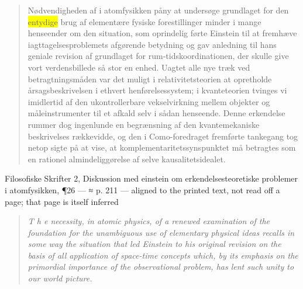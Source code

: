 \documentclass[11pt]{article}
\newcommand{\dcite}[1]{{\nopagebreak\raggedleft\small #1\par}\medskip}
\newcommand{\tlg}[1]{{\setlength{\fboxsep}{0.8pt}\colorbox{yellow}{#1}}}
\newcommand{\olg}[1]{{\setlength{\fboxsep}{0.8pt}\colorbox{cyan!25}{#1}}}
\begin{document}
\begin{quote}
Nødvendigheden af i atomfysikken påny at undersøge grundlaget for den \tlg{entydige} brug af elementære fysiske forestillinger minder i mange henseender om den situation, som oprindelig førte Einstein til at fremhæve iagttagelsesproblemets afgørende betydning og gav anledning til hans geniale revision af grundlaget for rum-tidskoordinationen, der skulle give vort verdensbillede så stor en enhed. Uagtet alle nye træk ved betragtningsmåden var det muligt i relativitetsteorien at opretholde årsagsbeskrivelsen i ethvert henførelsessystem; i kvanteteorien tvinges vi imidlertid af den ukontrollerbare vekselvirkning mellem objekter og måleinstrumenter til et afkald selv i sådan henseende. Denne erkendelse rummer dog ingenlunde en begrænsning af den kvantemekaniske beskrivelses rækkevidde, og den i Como-foredraget fremførte tankegang tog netop sigte på at vise, at komplementaritetssynspunktet må betragtes som en rationel almindeliggørelse af selve kausalitetsidealet.
\end{quote}
\dcite{Filosofiske Skrifter 2, Diskussion med einstein om erkendelsesteoretiske problemer i atomfysikken, ¶26 — ≈ p. 211 — aligned to the printed text, not read off a page; that page is itself inferred}
{\footnotesize\begin{quote}\itshape
T h e necessity, in atomic physics, of a renewed examination of the foundation for the \olg{unambiguous} use of elementary physical ideas recalls in some way the situation that led Einstein to his original revision on the basis of all application of space-time concepts which, by its emphasis on the primordial importance of the observational problem, has lent such unity to our world picture.
\end{quote}}
\end{document}

